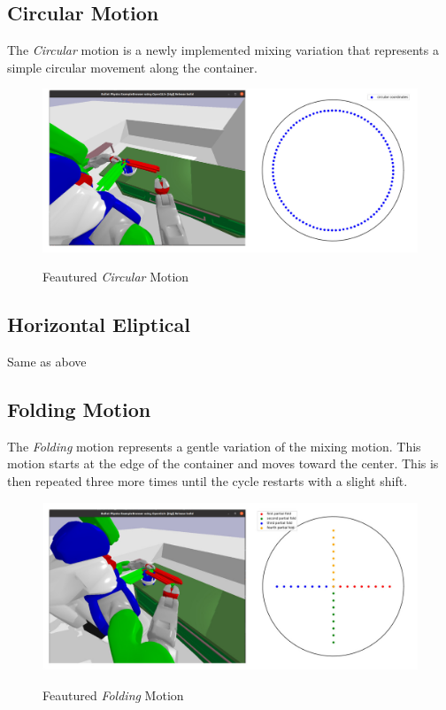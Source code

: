 \subsection{Circular Motion}
The \textit{Circular} motion is a newly implemented mixing variation that represents a simple circular movement along the container.
\begin{figure}[H]
    \includegraphics[scale=0.3]{Graphics/circular_showcase.jpg}
    \label{fig:circularshowcase}
    \caption{Feautured \textit{Circular} Motion}
\end{figure}
\subsection{Horizontal Eliptical}
Same as above

\subsection{Folding Motion}
The \textit{Folding} motion represents a gentle variation of the mixing motion. This motion starts at the edge of the container and moves toward the center. This is then repeated three more times until the cycle restarts with a slight shift.
\begin{figure}[H]
    \includegraphics[scale=0.3]{Graphics/folding_showcase.jpg}
    \label{fig:foldingshowcase}
    \caption{Feautured \textit{Folding} Motion}
\end{figure}

